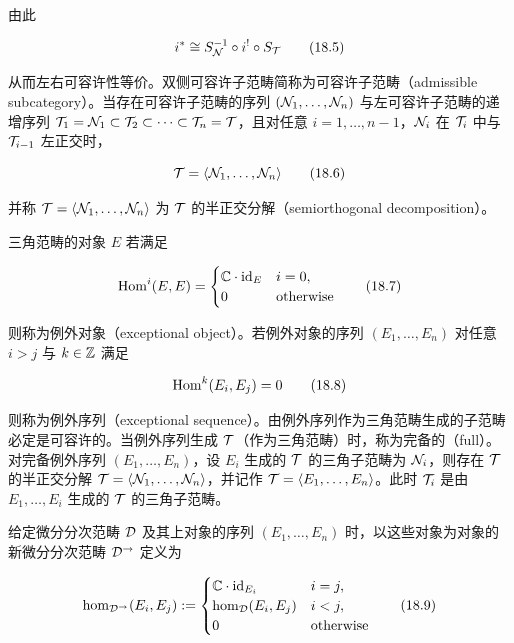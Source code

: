 由此

\begin{equation}
  i^{*} \cong S_{\mathcal{N}}^{-1}\circ i^{!}\circ S_{\mathcal{T}} \tag{18.5}
\end{equation}

从而左右可容许性等价。双侧可容许子范畴简称为可容许子范畴（admissible subcategory）。当存在可容许子范畴的序列 $(\mathcal{N}_1,\dots,\mathcal{N}_n)$ 与左可容许子范畴的递增序列 $\mathcal{T}_1=\mathcal{N}_1\subset\mathcal{T}_2\subset\dots\subset\mathcal{T}_n=\mathcal{T}$，且对任意 $i=1,\dots,n-1$，$\mathcal{N}_i$ 在 $\mathcal{T}_i$ 中与 $\mathcal{T}_{i-1}$ 左正交时，

\begin{equation}
  \mathcal{T} = \langle \mathcal{N}_1,\dots,\mathcal{N}_n \rangle \tag{18.6}
\end{equation}

并称 $\mathcal{T}=\langle\mathcal{N}_1,\dots,\mathcal{N}_n\rangle$ 为 $\mathcal{T}$ 的半正交分解（semiorthogonal decomposition）。

三角范畴的对象 $E$ 若满足

\begin{equation}
  \operatorname{Hom}^{i}(E,E) =
  \begin{cases}
    \mathbb{C}\cdot\mathrm{id}_{E} & i=0,\\
    0 & \text{otherwise}
  \end{cases} \tag{18.7}
\end{equation}

则称为例外对象（exceptional object）。若例外对象的序列 $(E_1,\dots,E_n)$ 对任意 $i>j$ 与 $k\in\mathbb{Z}$ 满足

\begin{equation}
  \operatorname{Hom}^{k}(E_i,E_j) = 0 \tag{18.8}
\end{equation}

则称为例外序列（exceptional sequence）。由例外序列作为三角范畴生成的子范畴必定是可容许的。当例外序列生成 $\mathcal{T}$（作为三角范畴）时，称为完备的（full）。对完备例外序列 $(E_1,\dots,E_n)$，设 $E_i$ 生成的 $\mathcal{T}$ 的三角子范畴为 $\mathcal{N}_i$，则存在 $\mathcal{T}$ 的半正交分解 $\mathcal{T}=\langle\mathcal{N}_1,\dots,\mathcal{N}_n\rangle$，并记作 $\mathcal{T}=\langle E_1,\dots,E_n\rangle$。此时 $\mathcal{T}_i$ 是由 $E_1,\dots,E_i$ 生成的 $\mathcal{T}$ 的三角子范畴。

给定微分分次范畴 $\mathcal{D}$ 及其上对象的序列 $(E_1,\dots,E_n)$ 时，以这些对象为对象的新微分分次范畴 $\mathcal{D}^{\to}$ 定义为

\begin{equation}
  \hom_{\mathcal{D}^{\to}}(E_i,E_j) :=
  \begin{cases}
    \mathbb{C}\cdot\mathrm{id}_{E_i} & i=j,\\
    \hom_{\mathcal{D}}(E_i,E_j) & i<j,\\
    0 & \text{otherwise}
  \end{cases} \tag{18.9}
\end{equation}

